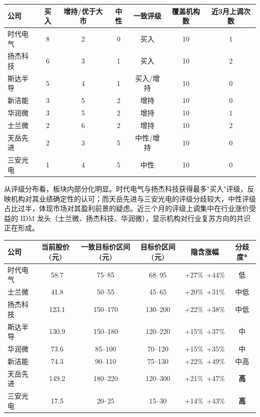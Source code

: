 \begin{exhibitbox}[表 7-3：卖方评级分布与覆盖度统计]
\centering
\small
\begin{tabularx}{\textwidth}{X c c c c c c}
\toprule
\textbf{公司} & \textbf{买入} & \textbf{增持/优于大市} & \textbf{中性} & \textbf{一致评级} & \textbf{覆盖机构数} & \textbf{近3月上调次数} \\
\midrule
时代电气 & 8 & 2 & 0 & 买入 & 10 & 1 \\
扬杰科技 & 6 & 3 & 1 & 买入 & 10 & 2 \\
斯达半导 & 5 & 4 & 1 & 买入/增持 & 10 & 0 \\
新洁能 & 3 & 5 & 2 & 增持 & 10 & 0 \\
华润微 & 3 & 5 & 2 & 增持 & 10 & 1 \\
士兰微 & 2 & 6 & 2 & 增持 & 10 & 2 \\
天岳先进 & 2 & 3 & 5 & 中性/增持 & 10 & 0 \\
三安光电 & 1 & 4 & 5 & 中性 & 10 & 0 \\
\bottomrule
\end{tabularx}
\end{exhibitbox}

从评级分布看，板块内部分化明显。时代电气与扬杰科技获得最多"买入"评级，反映机构对其业绩确定性的认可；而天岳先进与三安光电的评级分歧较大，中性评级占比过半，体现市场对其盈利前景的疑虑。近三个月的评级上调集中在行业涨价受益的 IDM 龙头（士兰微、扬杰科技、华润微），显示机构对行业复苏方向的共识正在形成。

\begin{exhibitbox}[表 7-4：一致目标价区间与隐含涨跌空间]
\centering
\small
\begin{tabularx}{\textwidth}{X c c c c c}
\toprule
\textbf{公司} & \textbf{当前股价(元)} & \textbf{一致目标价区间(元)} & \textbf{目标价区间(元)} & \textbf{隐含涨幅} & \textbf{分歧度*} \\
\midrule
\rowcolor{riskgreen!10}
时代电气 & ~58.7 & 75–85 & 68–95 & +27\%~+44\% & 低 \\
\rowcolor{riskgreen!10}
士兰微 & ~41.8 & 50–55 & 45–65 & +20\%~+31\% & 中低 \\
\rowcolor{riskamber!10}
扬杰科技 & ~123.1 & 150–170 & 130–200 & +22\%~+38\% & 中低 \\
\rowcolor{riskamber!10}
斯达半导 & ~130.9 & 150–180 & 120–220 & +15\%~+37\% & 中 \\
\rowcolor{riskamber!10}
华润微 & ~73.6 & 85–100 & 70–120 & +15\%~+35\% & 中 \\
\rowcolor{riskamber!10}
新洁能 & ~74.3 & 90–110 & 75–130 & +22\%~+49\% & 中高 \\
\rowcolor{riskred!10}
天岳先进 & ~149.2 & 180–220 & 120–300 & +21\%~+47\% & \textbf{高} \\
\rowcolor{riskred!10}
三安光电 & ~17.5 & 20–25 & 15–30 & +14\%~+43\% & \textbf{高} \\
\bottomrule
\end{tabularx}
\end{exhibitbox}

